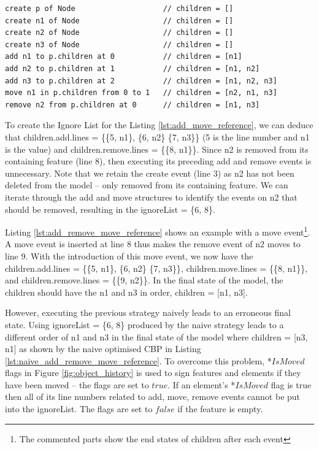 {\vspace{-20pt}
\begin{lstlisting}[style=eol,caption={A CBP representation of add, move, and remove operations.},label=lst:add_remove_move_reference]
create p of Node                    // children = []          
create n1 of Node                   // children = []         
create n2 of Node                   // children = []         
create n3 of Node                   // children = []
add n1 to p.children at 0           // children = [n1]
add n2 to p.children at 1           // children = [n1, n2]
add n3 to p.children at 2           // children = [n1, n2, n3]
move n1 in p.children from 0 to 1   // children = [n2, n1, n3] 
remove n2 from p.children at 0      // children = [n1, n3]
\end{lstlisting}

To create the Ignore List for the Listing \ref{lst:add_move_reference}, we can deduce that \textsf{children}.\textsf{add}.\textsf{lines} = \{\{5, \textsf{n1}\}, \{6, \textsf{n2}\} \{7, \textsf{n3}\}\} (5 is the line number and \textsf{n1} is the value) and \textsf{children}.\textsf{remove}.\textsf{lines} = \{\{8, \textsf{n1}\}\}. Since \textsf{n2} is removed from its containing feature (line 8), then executing its preceding add and remove events is unnecessary. Note that we retain the \textsf{create} event (line 3) as \textsf{n2} has not been deleted from the model -- only removed from its containing feature. We can iterate through the add and move structures to identify the events on \textsf{n2} that should be removed, resulting in the \textsf{ignoreList} = \{6, 8\}.

Listing \ref{lst:add_remove_move_reference} shows an example with a \textsf{move} event\footnote{The commented parts  show the end states of \textsf{children} after each event}. A \textsf{move} event is inserted at line 8 thus makes the \textsf{remove} event of \textsf{n2}  moves to line 9. With the introduction of this \textsf{move} event, we now have the \textsf{children}.\textsf{add}.\textsf{lines} = \{\{5, \textsf{n1}\}, \{6, \textsf{n2}\} \{7, \textsf{n3}\}\}, \textsf{children}.\textsf{move}.\textsf{lines} = \{\{8, \textsf{n1}\}\}, and \textsf{children}.\textsf{remove}.\textsf{lines} = \{\{9, \textsf{n2}\}\}. In the final state of the model, the \textsf{children} should have the \textsf{n1} and \textsf{n3} in order, \textsf{children} = [n1, n3].  

However, executing the previous strategy naively leads to an erroneous final state. Using \textsf{ignoreList} = \{6, 8\} produced by the naive strategy leads to a different order of \textsf{n1} and \textsf{n3} in the final state of the model where \textsf{children} = [n3, n1] as shown by the naive optimised CBP in Listing \ref{lst:naive_add_remove_move_reference}. To overcome this problem, *$IsMoved$ flags in Figure \ref{fig:object_history} is used to sign  features and elements if they have been moved -- the flags are set to $true$. If an element's *$IsMoved$ flag is true then all of its line numbers related to \textsf{add}, \textsf{move}, \textsf{remove} events cannot be put into the \textsf{ignoreList}. The flags are set to $false$ if the feature is empty. 

}
